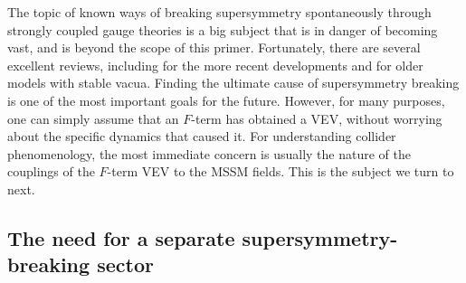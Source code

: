 \documentclass[11pt]{article}
\begin{document}
The topic of known ways of breaking supersymmetry spontaneously through
strongly coupled gauge theories is a big subject that is in danger of becoming vast, and is beyond 
the scope of this primer. Fortunately,
there are several excellent reviews, including 
\cite{susybreakingrevs} for the more recent developments and \cite{dynamicalsusybreaking}
for older models with stable vacua.
Finding the ultimate cause of supersymmetry breaking is one of the
most important goals for the future. However, for many purposes,
one can simply assume that an $F$-term has obtained a VEV, without
worrying about the specific dynamics that caused it. For
understanding collider phenomenology, the most immediate concern is usually
the nature of the couplings of the $F$-term VEV to the MSSM fields. 
This is the subject we turn to next.


\subsection{The need for a separate supersymmetry-breaking sector
\label{subsec:origins.sector}}
\setcounter{equation}{0}
\setcounter{footnote}{1}
\end{document}
